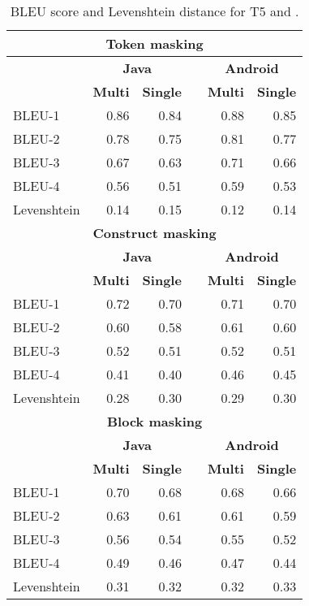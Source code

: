 
\begin{table}[h]
	\centering
	\caption{BLEU score and Levenshtein distance for T5 and \roberta.}
	\scriptsize
	\label{tab:bleu}
	\begin{tabular}{lrrrrr}
	\toprule
	\multicolumn{6}{c}{{\bf Token masking}}\\\midrule
	& \multicolumn{2}{c}{{\bf Java}} & & \multicolumn{2}{c}{{\bf Android}}\\ \cline{2-3} \cline{5-6}
	& {\bf Multi} & {\bf Single} & & {\bf Multi} & {\bf Single}\\\hline
	BLEU-1 & 0.86 & 0.84 && 0.88 & 0.85\\
	BLEU-2 & 0.78 & 0.75 && 0.81 & 0.77\\
	BLEU-3 & 0.67 & 0.63 && 0.71 & 0.66\\
	BLEU-4 & 0.56 & 0.51 && 0.59 & 0.53\\
	Levenshtein & 0.14 & 0.15 && 0.12 & 0.14\\\midrule
	
	
	\multicolumn{6}{c}{{\bf Construct masking}}\\\midrule
	& \multicolumn{2}{c}{{\bf Java}} & & \multicolumn{2}{c}{{\bf Android}}\\ \cline{2-3} \cline{5-6}
	& {\bf Multi} & {\bf Single} & & {\bf Multi} & {\bf Single}\\\hline
	BLEU-1 & 0.72 & 0.70 && 0.71 & 0.70\\
	BLEU-2 & 0.60 & 0.58 && 0.61 & 0.60\\
	BLEU-3 & 0.52 & 0.51 && 0.52 & 0.51\\
	BLEU-4 & 0.41 &0.40 && 0.46 & 0.45\\
	Levenshtein & 0.28 & 0.30 && 0.29 & 0.30 \\\midrule
	
	\multicolumn{6}{c}{{\bf Block masking}}\\\midrule
	& \multicolumn{2}{c}{{\bf Java}} & & \multicolumn{2}{c}{{\bf Android}}\\ \cline{2-3} \cline{5-6}
	& {\bf Multi} & {\bf Single} & & {\bf Multi} & {\bf Single}\\\hline
	BLEU-1 & 0.70 & 0.68 && 0.68 & 0.66\\
	BLEU-2 & 0.63 & 0.61 && 0.61 & 0.59\\
	BLEU-3 & 0.56 & 0.54 && 0.55 & 0.52\\
	BLEU-4 & 0.49 & 0.46 && 0.47 & 0.44\\
	Levenshtein & 0.31 & 0.32 &&0.32 & 0.33\\\bottomrule
\end{tabular} 
\end{table}
